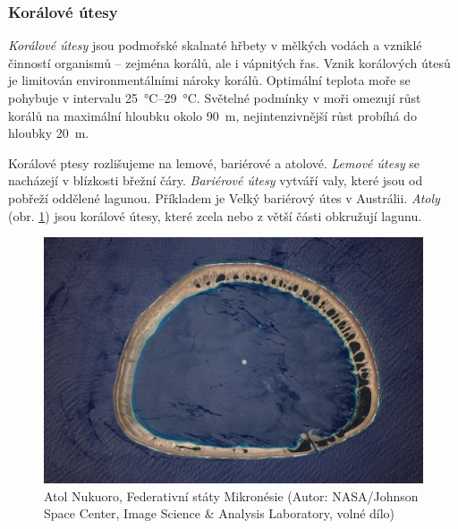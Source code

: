 %
%

\subsubsection{Korálové útesy}
\emph{Korálové útesy} jsou podmořské skalnaté hřbety v mělkých vodách a vzniklé činností organismů -- zejména korálů, ale i vápnitých řas. Vznik korálových útesů je limitován environmentálními nároky korálů. Optimální teplota moře se pohybuje v intervalu \SIrange{25}{29}{\celsius}. Světelné podmínky v moři omezují růst korálů na maximální hloubku okolo \SI{90}{\metre}, nejintenzivnější růst probíhá do hloubky \SI{20}{\metre}. 

Korálové ptesy rozlišujeme na lemové, bariérové a atolové. \emph{Lemové útesy} se nacházejí v blízkosti břežní čáry. \emph{Bariérové útesy} vytváří valy, které jsou od pobřeží oddělené lagunou. Příkladem je Velký bariérový útes v Austrálii. \emph{Atoly} (obr. \ref{fig:atol}) jsou korálové útesy, které zcela nebo z větší části obkružují lagunu.

\begin{figure}[h]
	\centering
	\includegraphics[width=1\linewidth]{obrazky/marine/atol}
	\caption{Atol Nukuoro, Federativní státy Mikronésie (Autor: NASA/Johnson Space Center, Image Science \& Analysis Laboratory, volné dílo)}
	\label{fig:atol}
\end{figure}

